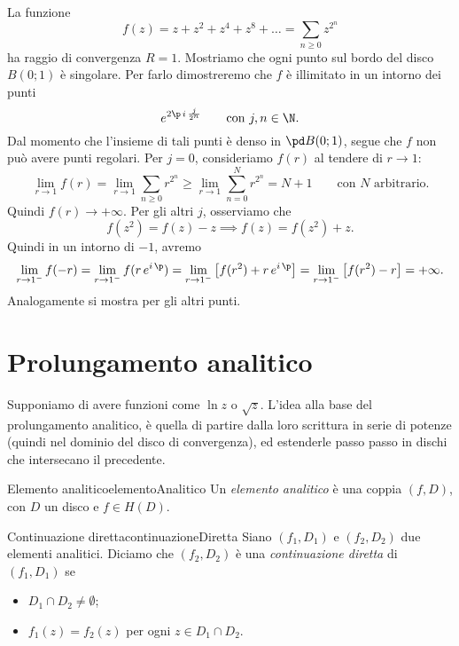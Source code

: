 \begin{ese}
	La funzione
	\[
		f(z) = z+z^2+z^4+z^8+\ldots = \sum_{n\ge 0} z^{2^n}
	\]
	ha raggio di convergenza \(R=1\). Mostriamo che ogni punto sul bordo del disco \(B(0;1)\) è singolare.
	Per farlo dimostreremo che \(f\) è illimitato in un intorno dei punti
	\[
		e^{2\p\,i\,\frac{j}{2^n}} \qquad\text{con }j,n\in\N.
	\]
	Dal momento che l'insieme di tali punti è denso in \(\pd B(0;1)\), segue che \(f\) non può avere punti regolari.
	Per \(j=0\), consideriamo \(f(r)\) al tendere di \(r\to 1\):
	\[
		\lim_{r\to 1} f(r) = \lim_{r\to 1} \sum_{n\ge 0} r^{2^n} \ge \lim_{r\to 1} \sum_{n=0}^N r^{2^n} = N+1 \qquad\text{con \(N\) arbitrario}.
	\]
	Quindi \(f(r) \to +\infty\).
	Per gli altri \(j\), osserviamo che
	\[
		f(z^2) = f(z)-z \implies f(z) = f(z^2)+z.
	\]
	Quindi in un intorno di \(-1\), avremo
	\[
		\lim_{r\to 1^-} f(-r) = \lim_{r\to 1^-} f(r\,e^{i\,\p}) = \lim_{r\to 1^-} \big[f(r^2)+r\,e^{i\,\p}\big] = \lim_{r\to 1^-} \big[f(r^2)-r\big] = +\infty.
	\]
	Analogamente si mostra per gli altri punti.
\end{ese}
\section{Prolungamento analitico}

Supponiamo di avere funzioni come \(\ln z\) o \(\sqrt{z}\). L'idea alla base del prolungamento analitico, è quella di partire dalla loro scrittura in serie di potenze (quindi nel dominio del disco di convergenza), ed estenderle passo passo in dischi che intersecano il precedente.

\begin{defn}{Elemento analitico}{elementoAnalitico}
	Un \emph{elemento analitico} è una coppia \((f,D)\), con \(D\) un disco e \(f\in H(D)\).
\end{defn}

\begin{defn}{Continuazione diretta}{continuazioneDiretta}
	Siano \((f_1,D_1)\) e \((f_2,D_2)\) due elementi analitici.
	Diciamo che \((f_2,D_2)\) è una \emph{continuazione diretta} di \((f_1,D_1)\) se
	\begin{itemize}
		\item \(D_1\cap D_2\neq \emptyset\);
		\item \(f_1(z)=f_2(z)\) per ogni \(z\in D_1\cap D_2\).
	\end{itemize}
\end{defn}


